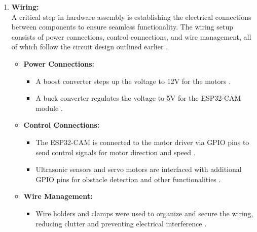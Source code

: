 \documentclass[12pt,a4paper]{report}
\begin{document}
\begin{enumerate}
\begin{itemize}
        
        
    \end{itemize}


    
    
\item \textbf{Wiring:} \\
A critical step in hardware assembly is establishing the electrical connections between components to ensure seamless functionality. The wiring setup consists of power connections, control connections, and wire management, all of which follow the circuit design outlined earlier \cite{iot, circuitdesign, robotsearch}.

\begin{itemize}
    \item \textbf{Power Connections:}
    \begin{itemize}
\item A boost converter steps up the voltage to 12V for the motors \cite{circuitdesign}.


        \item A buck converter regulates the voltage to 5V for the ESP32-CAM module \cite{circuitdesign}.
    \end{itemize}
    
    \item \textbf{Control Connections:}
    \begin{itemize}
        \item The ESP32-CAM is connected to the motor driver via GPIO pins to send control signals for motor direction and speed \cite{esp32cam}.
        \item Ultrasonic sensors and servo motors are interfaced with additional GPIO pins for obstacle detection and other functionalities \cite{iot, robotsearch}.
    \end{itemize}
    
    \item \textbf{Wire Management:}
    \begin{itemize}
        \item Wire holders and clamps were used to organize and secure the wiring, reducing clutter and preventing electrical interference \cite{robotsearch}.
    \end{itemize}
    

\end{itemize}
\end{enumerate}
\end{document}
